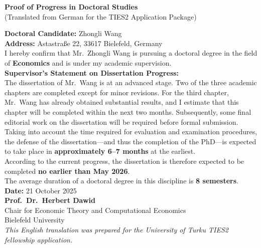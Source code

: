 \documentclass[11pt]{article}
\begin{document}
\begin{center}
{\Large \textbf{Proof of Progress in Doctoral Studies}}\\[0.2cm]
{\normalsize (Translated from German for the TIES2 Application Package)}
\end{center}

\vspace{0.5cm}

\noindent \textbf{Doctoral Candidate:} Zhongli Wang \\
\textbf{Address:} Astastraße 22, 33617 Bielefeld, Germany \\[0.4cm]

\noindent I hereby confirm that Mr.\ Zhongli Wang is pursuing a doctoral degree in the field of \textbf{Economics} and is under my academic supervision. \\[0.4cm]

\noindent \textbf{Supervisor’s Statement on Dissertation Progress:}\\[0.2cm]
The dissertation of Mr.\ Wang is at an advanced stage. Two of the three academic chapters are completed except for minor revisions. For the third chapter, Mr.\ Wang has already obtained substantial results, and I estimate that this chapter will be completed within the next two months. Subsequently, some final editorial work on the dissertation will be required before formal submission.\\[0.3cm]

Taking into account the time required for evaluation and examination procedures, the defense of the dissertation---and thus the completion of the PhD---is expected to take place in \textbf{approximately 6--7 months} at the earliest.\\[0.3cm]

According to the current progress, the dissertation is therefore expected to be completed \textbf{no earlier than May 2026}.\\[0.4cm]

\noindent The average duration of a doctoral degree in this discipline is \textbf{8 semesters}.\\[0.8cm]

\noindent \textbf{Date:} 21 October 2025\\[1.2cm]

\noindent \textbf{Prof.\ Dr.\ Herbert Dawid}\\
Chair for Economic Theory and Computational Economics\\
Bielefeld University\\[1cm]

\noindent \textit{This English translation was prepared for the University of Turku TIES2 fellowship application.}
\end{document}
